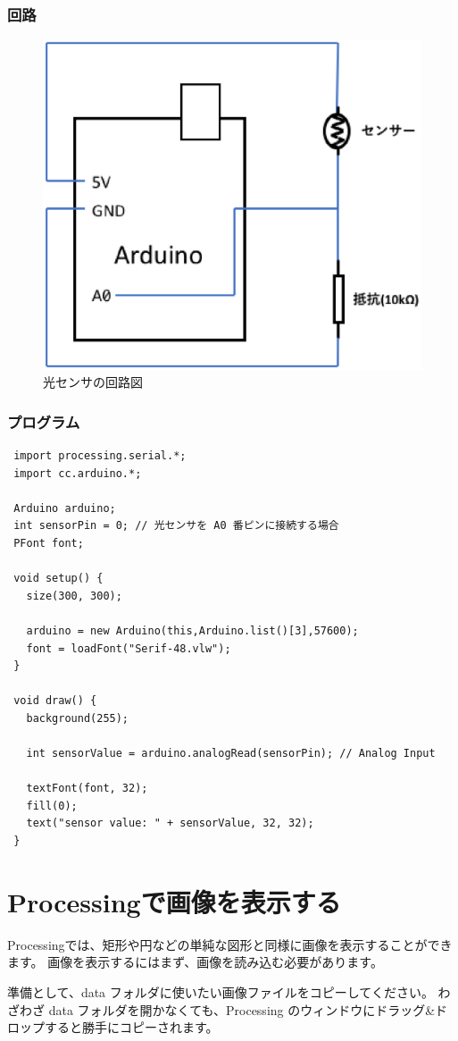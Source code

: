 \documentclass[11pt,a4paper]{jarticle}
\begin{document}
\subsubsection*{回路}
\begin{figure}[htbp]
 \centering
 \includegraphics[width=0.6\columnwidth]{img/AnalogInput.eps}
 \caption{光センサの回路図}
\end{figure}

\newpage

\subsubsection*{プログラム}
\begin{lstlisting}
 import processing.serial.*;
 import cc.arduino.*;
 
 Arduino arduino;
 int sensorPin = 0; // 光センサを A0 番ピンに接続する場合
 PFont font;
 
 void setup() {
   size(300, 300);

   arduino = new Arduino(this,Arduino.list()[3],57600);
   font = loadFont("Serif-48.vlw");
 }

 void draw() {
   background(255);

   int sensorValue = arduino.analogRead(sensorPin); // Analog Input

   textFont(font, 32);
   fill(0);
   text("sensor value: " + sensorValue, 32, 32);
 }
\end{lstlisting}

\section{Processingで画像を表示する}
Processingでは、矩形や円などの単純な図形と同様に画像を表示することができます。
画像を表示するにはまず、画像を読み込む必要があります。

準備として、data フォルダに使いたい画像ファイルをコピーしてください。
わざわざ data フォルダを開かなくても、Processing のウィンドウにドラッグ\&ドロップすると勝手にコピーされます。
\end{document}
